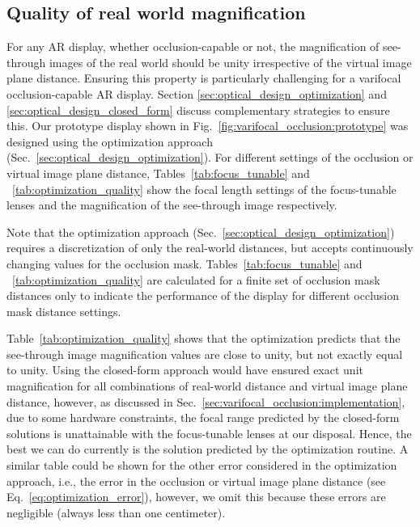 \subsection{Quality of real world magnification}
\label{sec:results_optimization_quality}


For any AR display, whether occlusion-capable or not, the magnification of see-through images of the real world should be unity irrespective of the virtual image plane distance. Ensuring this property is particularly challenging for a varifocal occlusion-capable AR display. Section \ref{sec:optical_design_optimization} and \ref{sec:optical_design_closed_form} discuss complementary strategies to ensure this. Our prototype display shown in Fig.~\ref{fig:varifocal_occlusion:prototype} was designed using the optimization approach (Sec.~\ref{sec:optical_design_optimization}). For different settings of the occlusion or virtual image plane distance, Tables~\ref{tab:focus_tunable} and ~\ref{tab:optimization_quality} show the focal length settings of the focus-tunable lenses and the magnification of the see-through image respectively. 

Note that the optimization approach (Sec.~\ref{sec:optical_design_optimization}) requires a discretization of only the real-world distances, but accepts continuously changing values for the occlusion mask. Tables~\ref{tab:focus_tunable} and ~\ref{tab:optimization_quality} are calculated for a finite set of occlusion mask distances only to indicate the performance of the display for different occlusion mask distance settings.

Table~\ref{tab:optimization_quality} shows that the optimization predicts that the see-through image magnification values are close to unity, but not exactly equal to unity. Using the closed-form approach would have ensured exact unit magnification for all combinations of real-world distance and virtual image plane distance, however, as discussed in Sec.~\ref{sec:varifocal_occlusion:implementation}, due to some hardware constraints, the focal range predicted by the closed-form solutions is unattainable with the focus-tunable lenses at our disposal. Hence, the best we can do currently is the solution predicted by the optimization routine. A similar table could be shown for the other error considered in the optimization approach, i.e., the error in the occlusion or virtual image plane distance (see Eq.~\ref{eq:optimization_error}), however, we omit this because these errors are negligible (always less than one centimeter). 

